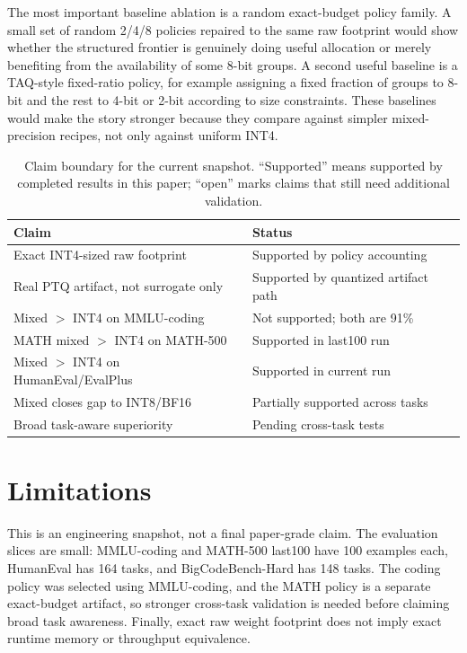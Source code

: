 \documentclass{article}
\begin{document}
The most important baseline ablation is a random exact-budget policy family. A small set of random 2/4/8 policies repaired to the same raw footprint would show whether the structured frontier is genuinely doing useful allocation or merely benefiting from the availability of some 8-bit groups. A second useful baseline is a TAQ-style fixed-ratio policy, for example assigning a fixed fraction of groups to 8-bit and the rest to 4-bit or 2-bit according to size constraints. These baselines would make the story stronger because they compare against simpler mixed-precision recipes, not only against uniform INT4.

\begin{table}[t]
\caption{Claim boundary for the current snapshot. ``Supported'' means supported by completed results in this paper; ``open'' marks claims that still need additional validation.}
\label{tab:claims}
\centering
\footnotesize
\begin{tabular}{p{}p{}}
\toprule
Claim & Status \\
\midrule
Exact INT4-sized raw footprint & Supported by policy accounting \\
Real PTQ artifact, not surrogate only & Supported by quantized artifact path \\
Mixed $>$ INT4 on MMLU-coding & Not supported; both are 91\% \\
MATH mixed $>$ INT4 on MATH-500 & Supported in last100 run \\
Mixed $>$ INT4 on HumanEval/EvalPlus & Supported in current run \\
Mixed closes gap to INT8/BF16 & Partially supported across tasks \\
Broad task-aware superiority & Pending cross-task tests \\
\bottomrule
\end{tabular}
\end{table}

\section{Limitations}

This is an engineering snapshot, not a final paper-grade claim. The evaluation slices are small: MMLU-coding and MATH-500 last100 have 100 examples each, HumanEval has 164 tasks, and BigCodeBench-Hard has 148 tasks. The coding policy was selected using MMLU-coding, and the MATH policy is a separate exact-budget artifact, so stronger cross-task validation is needed before claiming broad task awareness. Finally, exact raw weight footprint does not imply exact runtime memory or throughput equivalence.
\end{document}
